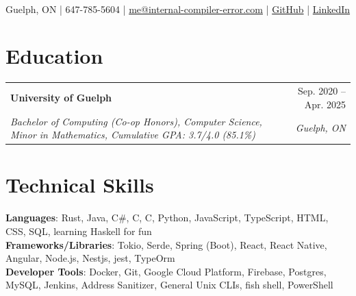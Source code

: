 \documentclass[letterpaper, 10pt]{report}
\makeatletter
\newcommand{\resumeSubheading}[4]{
    \begin{tabular*}{\textwidth}[t]{l@{\extracolsep{\fill}}r}
        \textbf{#1}       & #2                \\
        \textit{\small#3} & \textit{\small#4} \\
    \end{tabular*}\vspace{-0.7em}
}
\newcommand{\cxx}{C\nolinebreak\hspace{-.05em}\raisebox{0.03ex}{\bf +}\nolinebreak\hspace{-.05em}\raisebox{.03ex}{\bf +}}
\makeatother
\begin{document}
\begin{center}
    \textbf{\HUGE\color{Pink}{Liang Wang}} \\ \vspace{1.5em}
    \small Guelph, ON |
    647-785-5604 |
    \href{mailto:me@internal-compiler-error.com}{{me@internal-compiler-error.com}}  |
    \href{https://github.com/Internal-Compiler-Error}{{GitHub}} |
    \href{https://www.linkedin.com/in/liang-wang-225607174/}{{LinkedIn}} \\
\end{center}

\section{Education}
\resumeSubheading{University of Guelph}{Sep. 2020 -- Apr. 2025}{Bachelor of Computing (Co-op Honors), Computer Science, Minor in Mathematics, Cumulative GPA: 3.7/4.0 (85.1\%)}{Guelph, ON}


\section{Technical Skills}
\vspace{0.1em}
\begin{itemize}[leftmargin=0em, label={}]
    \small{\item{
        \textbf{Languages}{: Rust, Java, C\#, \cxx, C, Python, JavaScript, TypeScript, HTML, CSS, SQL, learning Haskell for fun} \\
        \textbf{Frameworks/Libraries}{: Tokio, Serde, Spring (Boot), React, React Native, Angular, Node.js, Nestjs, jest, TypeOrm} \\
        \textbf{Developer Tools}{: Docker, Git, Google Cloud Platform, Firebase, Postgres, MySQL, Jenkins, Address Sanitizer, General Unix CLIs, fish shell, PowerShell} \\
    }}
\end{itemize}


\end{document}
